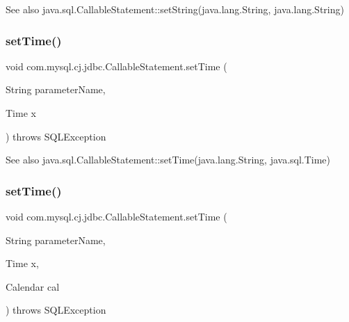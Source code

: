 \begin{DoxySeeAlso}{See also}
java.\+sql.\+Callable\+Statement\+::set\+String(java.\+lang.\+String, java.\+lang.\+String) 
\end{DoxySeeAlso}
\mbox{\label{classcom_1_1mysql_1_1cj_1_1jdbc_1_1_callable_statement_abaeaf443ba9998c9378de127b63c4eaa}} 
\subsubsection{\texorpdfstring{set\+Time()}{setTime()}\hspace{0.1cm}{\footnotesize\ttfamily [1/2]}}
{\footnotesize\ttfamily void com.\+mysql.\+cj.\+jdbc.\+Callable\+Statement.\+set\+Time (\begin{DoxyParamCaption}\item[{String}]{parameter\+Name,  }\item[{Time}]{x }\end{DoxyParamCaption}) throws S\+Q\+L\+Exception}

\begin{DoxySeeAlso}{See also}
java.\+sql.\+Callable\+Statement\+::set\+Time(java.\+lang.\+String, java.\+sql.\+Time) 
\end{DoxySeeAlso}
\mbox{\label{classcom_1_1mysql_1_1cj_1_1jdbc_1_1_callable_statement_ab2ce9627abfa776a9a481cc4f496d2ae}} 
\subsubsection{\texorpdfstring{set\+Time()}{setTime()}\hspace{0.1cm}{\footnotesize\ttfamily [2/2]}}
{\footnotesize\ttfamily void com.\+mysql.\+cj.\+jdbc.\+Callable\+Statement.\+set\+Time (\begin{DoxyParamCaption}\item[{String}]{parameter\+Name,  }\item[{Time}]{x,  }\item[{Calendar}]{cal }\end{DoxyParamCaption}) throws S\+Q\+L\+Exception}

